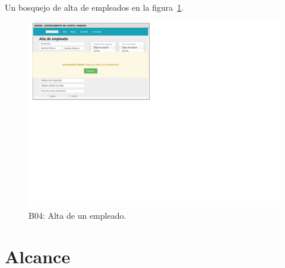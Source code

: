 Un bosquejo de alta de empleados en la figura~\ref{fig:b4}. 
\begin{figure}[H]
    \centering
    \includegraphics[scale=.4]{iu/mockup4.png}
    \centering
    \caption{B04: Alta de un empleado.}
    \label{fig:b4}
\end{figure}

\section{Alcance}


